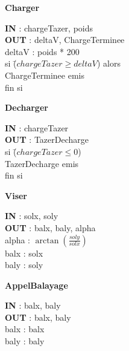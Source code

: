 \begin{description}
	
	\item \textbf{Charger}
		\begin{tabbing} 
		\textbf{IN} : chargeTazer, poids \\
		\textbf{OUT} : deltaV, ChargeTerminee \\
		deltaV : poids * 200 \\	
		si \=($chargeTazer \geq deltaV$) alors \\
			\>ChargeTerminee emis \\
		fin si
		\end{tabbing}

	\item \textbf{Decharger}
		\begin{tabbing} 
		\textbf{IN} : chargeTazer \\
		\textbf{OUT} : TazerDecharge \\
		si \=($chargeTazer \leq 0$) \\
			\>TazerDecharge emis \\
		fin si
		\end{tabbing} 

	\item \textbf{Viser}
		\begin{tabbing} 
		\textbf{IN} : solx, soly \\
		\textbf{OUT} : balx, baly, alpha \\
		alpha : $\arctan(\frac{soly}{solx})$ \\
		balx : solx \\
		baly : soly
		\end{tabbing} 

	\item \textbf{AppelBalayage}
		\begin{tabbing} 
		\textbf{IN} : balx, baly \\
		\textbf{OUT} : balx, baly \\
		balx : balx \\
		baly : baly
		\end{tabbing} 

\end{description}

\vfill
\pagebreak


